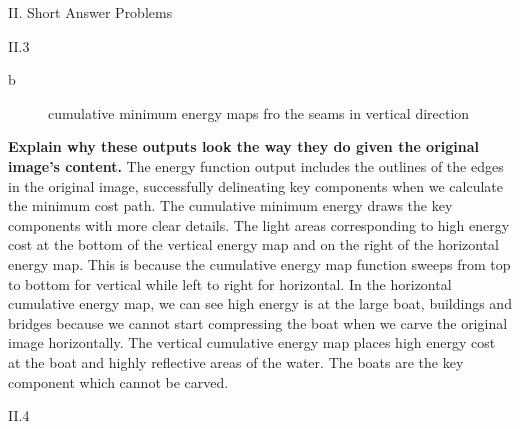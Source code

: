 \documentclass[a4paper,12pt]{article}
\begin{document}
\begin{section}{II. Short Answer Problems}
\begin{subsection}{II.3}
\begin{subsubsection}{b}
      \begin{figure}[!htb]
        \caption{cumulative minimum energy maps fro the seams in vertical direction}
      \end{figure}
 \end{subsubsection}  
      \textbf {Explain why these outputs look the way they do given the original image’s content.}
The energy function output includes the outlines of the edges in the original image, successfully delineating key components when we calculate the minimum cost path. The cumulative minimum energy draws the key components with more clear details. The light areas corresponding to high energy cost at the bottom of the vertical energy map and on the right of the horizontal energy map. This is because the cumulative energy map function sweeps from top to bottom for vertical while left to right for horizontal. In the horizontal cumulative energy map, we can see high energy is at the large boat, buildings and bridges because we cannot start compressing the boat when we carve the original image horizontally. The vertical cumulative energy map places high energy cost at the boat and highly reflective areas of the water. The boats are the key component which cannot be carved.



\end{subsection}

\clearpage
\begin{subsection}{II.4}



\end{subsection}
\end{section}
\end{document}
